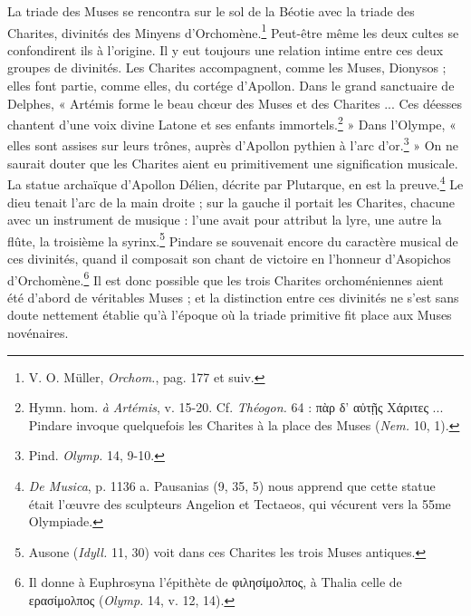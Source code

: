 \documentclass[a4paper, 11pt, oneside, polutonikogreek, french]{article}
\begin{document}
La triade des Muses se rencontra sur le sol de la Béotie avec la triade des Charites, divinités des Minyens d'Orchomène.\footnote{V. O. Müller, \emph{Orchom.}, pag. 177 et suiv.} Peut-être même les deux cultes se confondirent ils à l'origine. Il y eut toujours une relation intime entre ces deux groupes de divinités. Les Charites accompagnent, comme les Muses, Dionysos ; elles font partie, comme elles, du cortége d'Apollon. Dans le grand sanctuaire de Delphes, « Artémis forme le beau chœur des Muses et des Charites ... Ces déesses chantent d'une voix divine Latone et ses enfants immortels.\footnote{Hymn. hom. \emph{à Artémis}, v. 15-20. Cf. \emph{Théogon.} 64 : πὰρ δ' αὐτῇς Χάριτες ... Pindare invoque quelquefois les Charites à la place des Muses (\emph{Nem.} 10, 1).} » Dans l'Olympe, « elles sont assises sur leurs trônes, auprès d'Apollon pythien à l'arc d'or.\footnote{Pind. \emph{Olymp.} 14, 9-10.} » On ne saurait douter que les Charites aient eu primitivement une signification musicale. La statue archaïque d'Apollon Délien, décrite par Plutarque, en est la preuve.\footnote{\emph{De Musica}, p. 1136 a. Pausanias (9, 35, 5) nous apprend que cette statue était l'œuvre des sculpteurs Angelion et Tectaeos, qui vécurent vers la 55me Olympiade.} Le dieu tenait l'arc de la main droite ; sur la gauche il portait les Charites, chacune avec un instrument de musique : l'une avait pour attribut la lyre, une autre la flûte, la troisième la syrinx.\footnote{Ausone (\emph{Idyll.} 11, 30) voit dans ces Charites les trois Muses antiques.} Pindare se souvenait encore du caractère musical de ces divinités, quand il composait son chant de victoire en l'honneur d'Asopichos d'Orchomène.\footnote{Il donne à Euphrosyna l'épithète de φιλησίμολπος, à Thalia celle de ερασίμολπος (\emph{Olymp.} 14, v. 12, 14).} Il est donc possible que les trois Charites orchoméniennes aient été d'abord de véritables Muses ; et la distinction entre ces divinités ne s'est sans doute nettement établie qu'à l'époque où la triade primitive fit place aux Muses novénaires.
\end{document}
